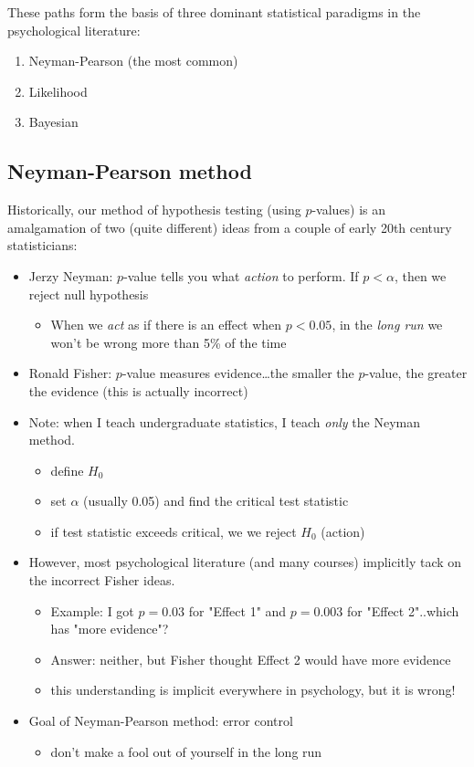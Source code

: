 \documentclass[11pt]{article}
\begin{document}
These paths form the basis of three dominant statistical paradigms in the psychological literature:
\begin{enumerate}
\item Neyman-Pearson (the most common)
\item Likelihood
\item Bayesian
\end{enumerate}

\subsection*{Neyman-Pearson method}
\label{sec-3-1}

Historically, our method of hypothesis testing (using $p$-values) is an amalgamation of two (quite different) ideas from a couple of early 20th century statisticians:

\begin{itemize}
\item Jerzy Neyman: $p$-value tells you what \emph{action} to perform.  If $p<\alpha$, then we reject null hypothesis
\begin{itemize}
\item When we \emph{act} as if there is an effect when $p<0.05$, in the \emph{long run} we won't be wrong more than 5\% of the time
\end{itemize}
\item Ronald Fisher: $p$-value measures evidence\ldots{}the smaller the $p$-value, the greater the evidence (this is actually incorrect)
\item Note: when I teach undergraduate statistics, I teach \emph{only} the Neyman method.  
\begin{itemize}
\item define $H_0$
\item set $\alpha$ (usually 0.05) and find the critical test statistic
\item if test statistic exceeds critical, we we reject $H_0$ (action)
\end{itemize}
\item However, most psychological literature (and many courses) implicitly tack on the incorrect Fisher ideas.  
\begin{itemize}
\item Example: I got $p=0.03$ for "Effect 1" and $p=0.003$ for "Effect 2"..which has "more evidence"?
\item Answer: neither, but Fisher thought Effect 2 would have more evidence
\item this understanding is implicit everywhere in psychology, but it is wrong!
\end{itemize}
\item Goal of Neyman-Pearson method: error control
\begin{itemize}
\item don't make a fool out of yourself in the long run
\end{itemize}
\end{itemize}
\end{document}
